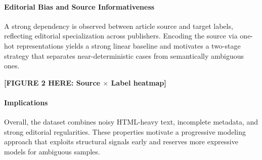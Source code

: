 \paragraph{Editorial Bias and Source Informativeness}
A strong dependency is observed between article source and target labels, reflecting editorial specialization across publishers. Encoding the source via one-hot representations yields a strong linear baseline and motivates a two-stage strategy that separates near-deterministic cases from semantically ambiguous ones.

\textbf{[FIGURE 2 HERE: Source $\times$ Label heatmap]}

\paragraph{Implications}
Overall, the dataset combines noisy HTML-heavy text, incomplete metadata, and strong editorial regularities. These properties motivate a progressive modeling approach that exploits structural signals early and reserves more expressive models for ambiguous samples.
